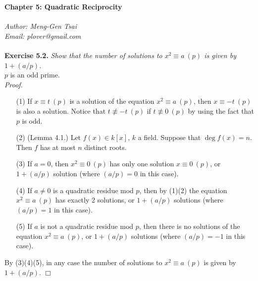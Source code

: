 \documentclass{article}
\begin{document}
\textbf{\Large Chapter 5: Quadratic Reciprocity} \\\\



\emph{Author: Meng-Gen Tsai} \\
\emph{Email: plover@gmail.com} \\\\










\textbf{Exercise 5.2.}
\emph{Show that the number of solutions to $x^2 \equiv a \: (p)$
is given by $1 + (a/p)$.} \\

$p$ is an odd prime. \\

\emph{Proof.}
\begin{enumerate}
\item[(1)]
If $x \equiv t \: (p)$ is a solution of the equation $x^2 \equiv a \: (p)$,
then $x \equiv -t \: (p)$ is also a solution.
Notice that $t \not\equiv -t \: (p)$ if $t \not\equiv 0 \: (p)$
by using the fact that $p$ is odd.
\item[(2)]
(Lemma 4.1.) Let $f(x) \in k[x]$, $k$ a field. Suppose that $\deg f(x) = n$.
Then $f$ has at most $n$ distinct roots.
\item[(3)]
If $a = 0$, then $x^2 \equiv 0 \: (p)$ has only one solution $x \equiv 0 \: (p)$,
or $1 + (a/p)$ solution (where $(a/p) = 0$ in this case).
\item[(4)]
If $a \neq 0$ is a quadratic residue mod $p$, then by (1)(2)
the equation $x^2 \equiv a \: (p)$ has exactly 2 solutions, or $1 + (a/p)$ solutions
(where $(a/p) = 1$ in this case).
\item[(5)]
If $a$ is not a quadratic residue mod $p$,
then there is no solutions of the equation $x^2 \equiv a \: (p)$,
or $1 + (a/p)$ solutions (where $(a/p) = -1$ in this case).
\end{enumerate}
By (3)(4)(5), in any case the number of solutions to $x^2 \equiv a \: (p)$
is given by $1 + (a/p)$.
$\Box$ \\\\



\end{document}
